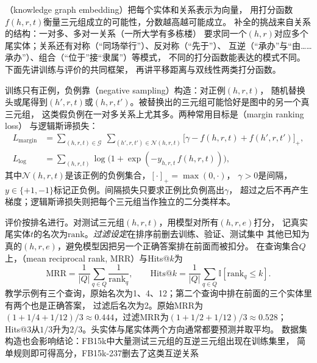 （knowledge graph embedding）把每个实体和关系表示为向量，
用打分函数$f(h,r,t)$衡量三元组成立的可能性，分数越高越可能成立。
补全的挑战来自关系的结构：一对多、多对一关系（一所大学有多栋楼）
要求同一个$(h,r)$对应多个尾实体；关系还有对称（“同场举行”）、反对称（“先于”）、
互逆（“承办”与“由……承办”）、组合（“位于”接“隶属”）等模式，
不同的打分函数能表达的模式不同。下面先讲训练与评价的共同框架，
再讲平移距离与双线性两类打分函数。

训练只有正例，负例靠（negative sampling）构造：对正例$(h,r,t)$，
随机替换头或尾得到$(h',r,t)$或$(h,r,t')$。被替换出的三元组可能恰好是图中的另一个真三元组，
这类假负例在一对多关系上尤其多。两种常用目标是（margin ranking loss）
与逻辑斯谛损失：
\begin{equation}
  \begin{aligned}
  L_{\mathrm{margin}}&=\sum_{(h,r,t)\in\mathcal{G}}\ \sum_{(h',r,t')\in\mathcal{N}(h,r,t)}
  \bigl[\gamma-f(h,r,t)+f(h',r,t')\bigr]_+,\\
  L_{\mathrm{log}}&=\sum_{(h,r,t)}\log\bigl(1+\exp(-y_{h,r,t}\,f(h,r,t))\bigr),
  \end{aligned}
  \label{eq:nlp-extraction-kge-margin}
\end{equation}
其中$\mathcal{N}(h,r,t)$是该正例的负例集合，$[\cdot]_+=\max(0,\cdot)$，
$\gamma>0$是间隔，$y\in\{+1,-1\}$标记正负例。间隔损失只要求正例比负例高出$\gamma$，
超过之后不再产生梯度；逻辑斯谛损失则把每个三元组当作独立的二分类样本。

评价按排名进行。对测试三元组$(h,r,t)$，用模型对所有$(h,r,e)$打分，
记真实尾实体$t$的名次为$\mathrm{rank}$。\emph{过滤设定}在排序前删去训练、验证、测试集中
其他已知为真的$(h,r,e)$，避免模型因把另一个正确答案排在前面而被扣分。
在查询集合$Q$上，（mean reciprocal rank, MRR）与Hits@$k$为
\begin{equation}
  \mathrm{MRR}=\frac{1}{|Q|}\sum_{q\in Q}\frac{1}{\mathrm{rank}_q},
  \qquad
  \mathrm{Hits@}k=\frac{1}{|Q|}\sum_{q\in Q}\mathbb{I}[\mathrm{rank}_q\leq k].
  \label{eq:nlp-extraction-mrr}
\end{equation}
教学示例有三个查询，原始名次为1、4、12；第二个查询中排在前面的三个实体里有两个也是正确答案，
过滤后名次为2。原始MRR为$(1+1/4+1/12)/3\approx0.444$，过滤MRR为$(1+1/2+1/12)/3\approx0.528$；
Hits@3从$1/3$升为$2/3$。头实体与尾实体两个方向通常都要预测并取平均。
数据集构造也会影响结论：FB15k中大量测试三元组的互逆三元组出现在训练集里，
简单规则即可得高分，FB15k-237删去了这类互逆关系

